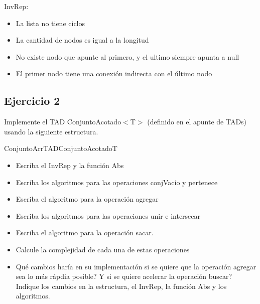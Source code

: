 {InvRep:
\begin{itemize}
	\item La lista no tiene ciclos
	\item La cantidad de nodos es igual a la longitud
	\item No existe nodo que apunte al primero, y el ultimo siempre apunta a null
	\item El primer nodo tiene una conexión indirecta con el último nodo
\end{itemize}

}

\subsection{Ejercicio 2}
Implemente el TAD ConjuntoAcotado$<$T$>$ (definido en el apunte de TADs) usando la siguiente estructura.

\begin{module}{ConjuntoArr}{TAD}{ConjuntoAcotado}{T}
\end{module}

\begin{itemize}
	\item Escriba el InvRep y la función Abs
	\item Escriba los algoritmos para las operaciones conjVacío y pertenece
	\item Escriba el algoritmo para la operación agregar
	\item Escriba los algoritmos para las operaciones unir e intersecar
	\item Escriba el algoritmo para la operación sacar.
	\item Calcule la complejidad de cada una de estas operaciones
	\item Qué cambios haría en su implementación si se quiere que la operación agregar sea lo más rápdia posible? Y si se quiere acelerar la operación buscar? Indique los cambios en la estructura, el InvRep, la función Abs y los algoritmos.
\end{itemize}

\pagebreak

